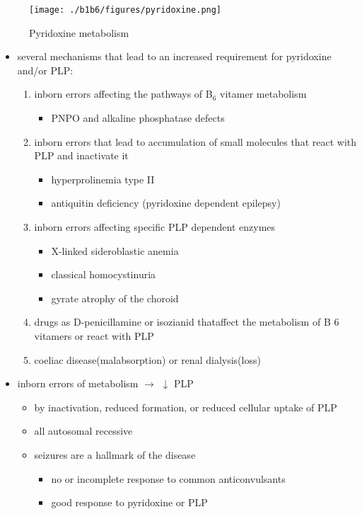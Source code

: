 \documentclass{scrartcl}
\begin{document}
\begin{figure}[htbp]
\centering
\texttt{[image: ./b1b6/figures/pyridoxine.png]}
\caption{\label{fig:org354e4cc}
Pyridoxine metabolism}
\end{figure}

\begin{itemize}
\item several mechanisms that lead to an increased requirement for
pyridoxine and/or PLP:
\begin{enumerate}
\item inborn errors affecting the pathways of B\(_{\text{6}}\) vitamer metabolism
\begin{itemize}
\item PNPO and alkaline phosphatase defects
\end{itemize}
\item inborn errors that lead to accumulation of small molecules that
react with PLP and inactivate it
\begin{itemize}
\item hyperprolinemia type II
\item antiquitin deficiency (pyridoxine dependent epilepsy)
\end{itemize}
\item inborn errors affecting specific PLP dependent enzymes
\begin{itemize}
\item X-linked sideroblastic anemia
\item classical homocystinuria
\item gyrate atrophy of the choroid
\end{itemize}
\item drugs as D-penicillamine or isozianid thataffect the metabolism of
B 6 vitamers or react with PLP
\item coeliac disease(malabsorption) or renal dialysis(loss)
\end{enumerate}
\item inborn errors of metabolism \(\to\) \(\downarrow\) PLP
\begin{itemize}
\item by inactivation, reduced formation, or reduced cellular uptake of PLP
\item all autosomal recessive
\item seizures are a hallmark of the disease
\begin{itemize}
\item no or incomplete response to common anticonvulsants
\item good response to pyridoxine or PLP
\end{itemize}
\end{itemize}
\end{itemize}
\end{document}
